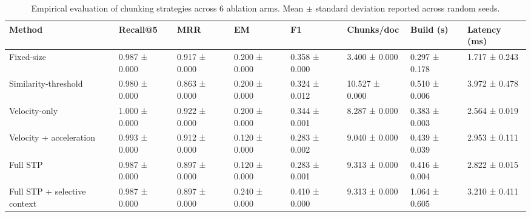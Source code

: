 \begin{table}[t]
\centering
\caption{Empirical evaluation of chunking strategies across 6 ablation arms. Mean $\pm$ standard deviation reported across random seeds.}
\label{tab:results}
\begin{tabularx}{\textwidth}{lXXXXXXX}
\toprule
\textbf{Method} & \textbf{Recall@5} & \textbf{MRR} & \textbf{EM} & \textbf{F1} & \textbf{Chunks/doc} & \textbf{Build (s)} & \textbf{Latency (ms)} \\
\midrule
Fixed-size & 0.987 ± 0.000 & 0.917 ± 0.000 & 0.200 ± 0.000 & 0.358 ± 0.000 & 3.400 ± 0.000 & 0.297 ± 0.178 & 1.717 ± 0.243 \\
Similarity-threshold & 0.980 ± 0.000 & 0.863 ± 0.000 & 0.200 ± 0.000 & 0.324 ± 0.012 & 10.527 ± 0.000 & 0.510 ± 0.006 & 3.972 ± 0.478 \\
Velocity-only & 1.000 ± 0.000 & 0.922 ± 0.000 & 0.200 ± 0.000 & 0.344 ± 0.001 & 8.287 ± 0.000 & 0.383 ± 0.003 & 2.564 ± 0.019 \\
Velocity + acceleration & 0.993 ± 0.000 & 0.912 ± 0.000 & 0.120 ± 0.000 & 0.283 ± 0.002 & 9.040 ± 0.000 & 0.439 ± 0.039 & 2.953 ± 0.111 \\
Full STP & 0.987 ± 0.000 & 0.897 ± 0.000 & 0.120 ± 0.000 & 0.283 ± 0.001 & 9.313 ± 0.000 & 0.416 ± 0.004 & 2.822 ± 0.015 \\
Full STP + selective context & 0.987 ± 0.000 & 0.897 ± 0.000 & 0.240 ± 0.000 & 0.410 ± 0.000 & 9.313 ± 0.000 & 1.064 ± 0.605 & 3.210 ± 0.411 \\
\bottomrule
\end{tabularx}
\end{table}